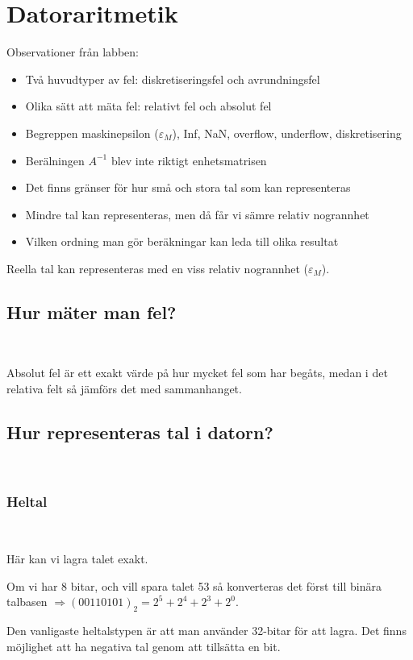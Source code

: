 \section{Datoraritmetik}
\par\bigskip
\noindent Observationer från labben:
\begin{itemize}
  \item Två huvudtyper av fel: diskretiseringsfel och avrundningsfel
  \item Olika sätt att mäta fel: relativt fel och absolut fel
  \item Begreppen maskinepsilon ($\varepsilon_M$), Inf, NaN, overflow, underflow, diskretisering
  \item Berälningen $A^{-1}$ blev inte riktigt enhetsmatrisen
  \item Det finns gränser för hur små och stora tal som kan representeras
  \item Mindre tal kan representeras, men då får vi sämre relativ nogrannhet
  \item Vilken ordning man gör beräkningar kan leda till olika resultat
\end{itemize}
\par\bigskip
\noindent Reella tal kan representeras med en viss relativ nogrannhet ($\varepsilon_M$). 
\par\bigskip
\subsection{Hur mäter man fel?}\hfill\\
\par\bigskip
\noindent Absolut fel är ett exakt värde på hur mycket fel som har begåts, medan i det relativa felt så jämförs det med sammanhanget.
\par\bigskip
\subsection{Hur representeras tal i datorn?}\hfill\\
\subsubsection{Heltal}\hfill\\
\par\bigskip
\noindent Här kan vi lagra talet exakt.\par
\noindent Om vi har 8 bitar, och vill spara talet 53 så konverteras det först till binära talbasen $\Rightarrow (00110101)_2 = 2^5+2^4+2^3+2^0$.\par
\noindent Den vanligaste heltalstypen är att man använder 32-bitar för att lagra. Det finns möjlighet att ha negativa tal genom att tillsätta en bit.
\par\bigskip
